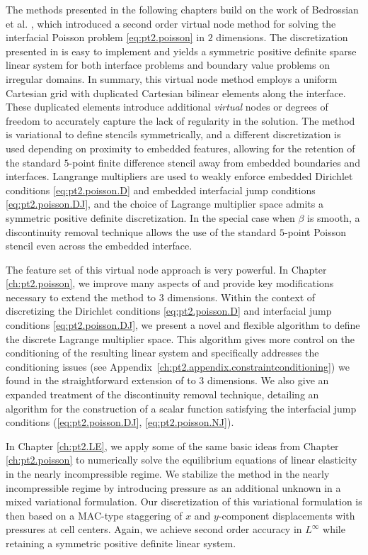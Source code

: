The methods presented in the following chapters build on the work of Bedrossian et al. \cite{Bedrossian10}, which introduced a second order virtual node method for solving the interfacial Poisson problem \eqref{eq:pt2.poisson} in $2$ dimensions. The discretization presented in \cite{Bedrossian10} is easy to implement and yields a symmetric positive definite sparse linear system for both interface problems and boundary value problems on irregular domains. In summary, this virtual node method employs a uniform Cartesian grid with duplicated Cartesian bilinear elements along the interface. These duplicated elements introduce additional \emph{virtual} nodes or degrees of freedom to accurately capture the lack of regularity in the solution. The method is variational to define stencils symmetrically, and a different discretization is used depending on proximity to embedded features, allowing for the retention of the standard $5$-point finite difference stencil away from embedded boundaries and interfaces. Langrange multipliers are used to weakly enforce embedded Dirichlet conditions \eqref{eq:pt2.poisson.D} and embedded interfacial jump conditions \eqref{eq:pt2.poisson.DJ}, and the choice of Lagrange multiplier space admits a symmetric positive definite discretization. In the special case when $\beta$ is smooth, a discontinuity removal technique allows the use of the standard $5$-point Poisson stencil even across the embedded interface.

The feature set of this virtual node approach is very powerful. In Chapter \ref{ch:pt2.poisson}, we improve many aspects of \cite{Bedrossian10} and provide key modifications necessary to extend the method to $3$ dimensions. Within the context of discretizing the Dirichlet conditions \eqref{eq:pt2.poisson.D} and interfacial jump conditions \eqref{eq:pt2.poisson.DJ}, we present a novel and flexible algorithm to define the discrete Lagrange multiplier space. This algorithm gives more control on the conditioning of the resulting linear system and specifically addresses the conditioning issues (see Appendix~\ref{ch:pt2.appendix.constraintconditioning}) we found in the straightforward extension of \cite{Bedrossian10} to $3$ dimensions. We also give an expanded treatment of the discontinuity removal technique, detailing an algorithm for the construction of a scalar function satisfying the interfacial jump conditions (\ref{eq:pt2.poisson.DJ}, \ref{eq:pt2.poisson.NJ}).

In Chapter \ref{ch:pt2.LE}, we apply some of the same basic ideas from Chapter \ref{ch:pt2.poisson} to numerically solve the equilibrium equations of linear elasticity in the nearly incompressible regime. We stabilize the method in the nearly incompressible regime by introducing pressure as an additional unknown in a mixed variational formulation. Our discretization of this variational formulation is then based on a MAC-type staggering of $x$ and $y$-component displacements with pressures at cell centers. Again, we achieve second order accuracy in $L^{\infty}$ while retaining a symmetric positive definite linear system.

